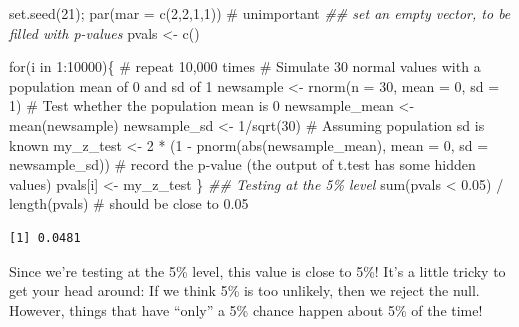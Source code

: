 \documentclass[
  letterpaper,
  DIV=11,
  numbers=noendperiod,
  oneside]{scrreprt}
\newenvironment{Shaded}{\begin{snugshade}}{\end{snugshade}}
\newcommand{\AttributeTok}[1]{\textcolor[rgb]{0.40,0.45,0.13}{#1}}
\newcommand{\CommentTok}[1]{\textcolor[rgb]{0.37,0.37,0.37}{#1}}
\newcommand{\ControlFlowTok}[1]{\textcolor[rgb]{0.00,0.23,0.31}{#1}}
\newcommand{\DecValTok}[1]{\textcolor[rgb]{0.68,0.00,0.00}{#1}}
\newcommand{\DocumentationTok}[1]{\textcolor[rgb]{0.37,0.37,0.37}{\textit{#1}}}
\newcommand{\FloatTok}[1]{\textcolor[rgb]{0.68,0.00,0.00}{#1}}
\newcommand{\FunctionTok}[1]{\textcolor[rgb]{0.28,0.35,0.67}{#1}}
\newcommand{\NormalTok}[1]{\textcolor[rgb]{0.00,0.23,0.31}{#1}}
\newcommand{\OtherTok}[1]{\textcolor[rgb]{0.00,0.23,0.31}{#1}}
\newcommand{\SpecialCharTok}[1]{\textcolor[rgb]{0.37,0.37,0.37}{#1}}
\begin{document}
\begin{Shaded}
\begin{Highlighting}[]
\FunctionTok{set.seed}\NormalTok{(}\DecValTok{21}\NormalTok{); }\FunctionTok{par}\NormalTok{(}\AttributeTok{mar =} \FunctionTok{c}\NormalTok{(}\DecValTok{2}\NormalTok{,}\DecValTok{2}\NormalTok{,}\DecValTok{1}\NormalTok{,}\DecValTok{1}\NormalTok{)) }\CommentTok{\# unimportant}
\DocumentationTok{\#\# set an empty vector, to be filled with p{-}values}
\NormalTok{pvals }\OtherTok{\textless{}{-}} \FunctionTok{c}\NormalTok{() }

\ControlFlowTok{for}\NormalTok{(i }\ControlFlowTok{in} \DecValTok{1}\SpecialCharTok{:}\DecValTok{10000}\NormalTok{)\{ }\CommentTok{\# repeat 10,000 times}
    \CommentTok{\# Simulate 30 normal values with a population mean of 0 and sd of 1}
\NormalTok{    newsample }\OtherTok{\textless{}{-}} \FunctionTok{rnorm}\NormalTok{(}\AttributeTok{n =} \DecValTok{30}\NormalTok{, }\AttributeTok{mean =} \DecValTok{0}\NormalTok{, }\AttributeTok{sd =} \DecValTok{1}\NormalTok{)}
    \CommentTok{\# Test whether the population mean is 0}
\NormalTok{    newsample\_mean }\OtherTok{\textless{}{-}} \FunctionTok{mean}\NormalTok{(newsample)}
\NormalTok{    newsample\_sd }\OtherTok{\textless{}{-}} \DecValTok{1}\SpecialCharTok{/}\FunctionTok{sqrt}\NormalTok{(}\DecValTok{30}\NormalTok{) }\CommentTok{\# Assuming population sd is known}
\NormalTok{    my\_z\_test }\OtherTok{\textless{}{-}} \DecValTok{2} \SpecialCharTok{*}\NormalTok{ (}\DecValTok{1} \SpecialCharTok{{-}} \FunctionTok{pnorm}\NormalTok{(}\FunctionTok{abs}\NormalTok{(newsample\_mean), }\AttributeTok{mean =} \DecValTok{0}\NormalTok{, }\AttributeTok{sd =}\NormalTok{ newsample\_sd))}
    \CommentTok{\# record the p{-}value (the output of t.test has some hidden values)}
\NormalTok{    pvals[i] }\OtherTok{\textless{}{-}}\NormalTok{ my\_z\_test}
\NormalTok{\}}
\DocumentationTok{\#\# Testing at the 5\% level}
\FunctionTok{sum}\NormalTok{(pvals }\SpecialCharTok{\textless{}} \FloatTok{0.05}\NormalTok{) }\SpecialCharTok{/} \FunctionTok{length}\NormalTok{(pvals) }\CommentTok{\# should be close to 0.05}
\end{Highlighting}
\end{Shaded}

\begin{verbatim}
[1] 0.0481
\end{verbatim}

Since we're testing at the 5\% level, this value is close to 5\%! It's a
little tricky to get your head around: If we think 5\% is too unlikely,
then we reject the null. However, things that have ``only'' a 5\% chance
happen about 5\% of the time!
\end{document}
